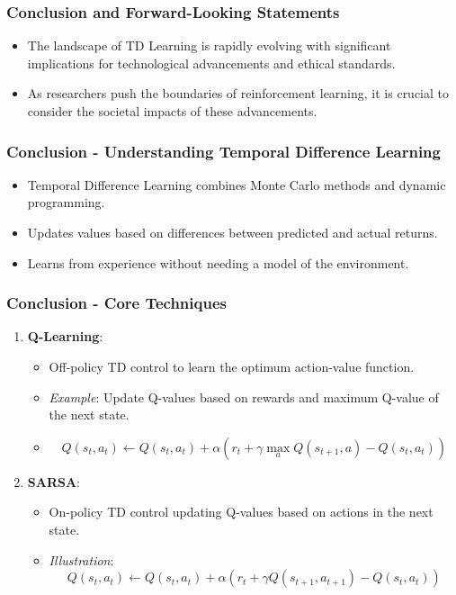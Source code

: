 \documentclass[aspectratio=169]{beamer}
\begin{document}
\begin{frame}[fragile]
    \frametitle{Conclusion and Forward-Looking Statements}
    \begin{itemize}
        \item The landscape of TD Learning is rapidly evolving with significant implications for technological advancements and ethical standards.
        \item As researchers push the boundaries of reinforcement learning, it is crucial to consider the societal impacts of these advancements.
    \end{itemize}
\end{frame}

\begin{frame}[fragile]
    \frametitle{Conclusion - Understanding Temporal Difference Learning}
    \begin{itemize}
        \item Temporal Difference Learning combines Monte Carlo methods and dynamic programming.
        \item Updates values based on differences between predicted and actual returns.
        \item Learns from experience without needing a model of the environment.
    \end{itemize}
\end{frame}

\begin{frame}[fragile]
    \frametitle{Conclusion - Core Techniques}
    \begin{enumerate}
        \item \textbf{Q-Learning}: 
        \begin{itemize}
            \item Off-policy TD control to learn the optimum action-value function.
            \item \textit{Example}: Update Q-values based on rewards and maximum Q-value of the next state.
            \item \begin{equation}
            Q(s_t, a_t) \leftarrow Q(s_t, a_t) + \alpha \left( r_t + \gamma \max_a Q(s_{t+1}, a) - Q(s_t, a_t) \right)
            \end{equation}        
        \end{itemize}
        
        \item \textbf{SARSA}:
        \begin{itemize}
            \item On-policy TD control updating Q-values based on actions in the next state.
            \item \textit{Illustration}:
            \begin{equation}
            Q(s_t, a_t) \leftarrow Q(s_t, a_t) + \alpha \left( r_t + \gamma Q(s_{t+1}, a_{t+1}) - Q(s_t, a_t) \right)
            \end{equation}
        \end{itemize}
    \end{enumerate}
\end{frame}
\end{document}
